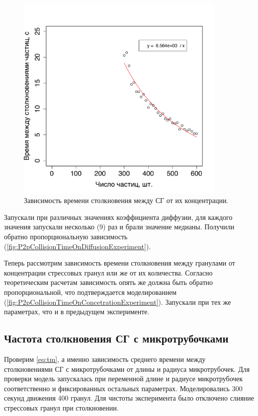 \documentclass[14pt,a4paper]{extarticle}
\begin{document}
\begin{figure}[htbp]\centering
\includegraphics[width=0.9\textwidth]{../results/P2pCollisionTimeOnConcetrationExperiment.pdf}
\caption{Зависимость времени столкновения между СГ от их концентрации.}
\label{fig:P2pCollisionTimeOnConcetrationExperiment}
\end{figure}

Запускали при различных значениях коэффициента диффузии, для каждого значения запускали несколько (9) раз и брали значение медианы. Получили обратно пропорциональную зависимость (\autoref{fig:P2pCollisionTimeOnDiffusionExperiment}).

Теперь рассмотрим зависимость времени столкновения между гранулами от концентрации стрессовых гранул или же от их количества. Согласно теоретическим расчетам зависимость опять же должна быть обратно пропорциональной, что подтверждается моделированием (\autoref{fig:P2pCollisionTimeOnConcetrationExperiment}). Запускали при тех же параметрах, что и в предыдущем эксперименте.


\FloatBarrier
\subsection{Частота столкновения СГ с микротрубочками}
Проверим \autoref{eq:tm}, а именно зависимость среднего времени между столкновениями СГ с микротрубочками от длины и радиуса микротрубочек. Для проверки модель запускалась при переменной длине и радиусе микротрубочек соответственно и фиксированных остальных параметрах. Моделировались 300 секунд движения 400 гранул. Для чистоты эксперимента было отключено слияние стрессовых гранул при столкновении.
\end{document}
